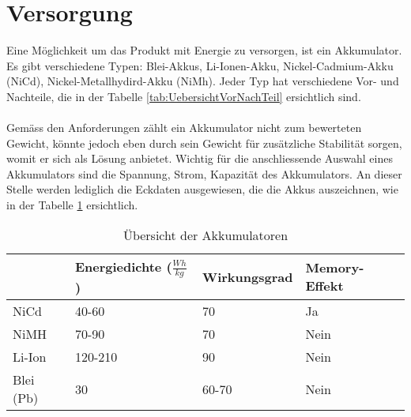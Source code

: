 ﻿\section{Versorgung}
Eine Möglichkeit um das Produkt mit Energie zu versorgen, ist ein Akkumulator. Es gibt verschiedene Typen: Blei-Akkus, Li-Ionen-Akku, Nickel-Cadmium-Akku (NiCd), Nickel-Metallhydird-Akku (NiMh). Jeder Typ hat verschiedene Vor- und Nachteile, die in der Tabelle \ref{tab:UebersichtVorNachTeil} ersichtlich sind.\\
\\
Gemäss den Anforderungen zählt ein Akkumulator nicht zum bewerteten Gewicht, könnte jedoch eben durch sein Gewicht für zusätzliche Stabilität sorgen, womit er sich als Lösung anbietet. Wichtig für die anschliessende Auswahl eines Akkumulators sind die Spannung, Strom, Kapazität des Akkumulators. An dieser Stelle werden lediglich die Eckdaten ausgewiesen, die die Akkus auszeichnen, wie in der Tabelle \ref{tab:UebersichtAkku} ersichtlich.\\ 

\begin{table}[h!]
	\begin{tabular}{|p{1.5cm}|p{3.4cm}|p{2.6cm}|p{2.8cm}|} \hline
		          &\textbf{Energiedichte} ($\frac{Wh}{kg}$)  & \textbf{Wirkungsgrad} & \textbf{Memory-Effekt}\\ \hline
		NiCd      & 40-60                                    & 70                    & Ja \\ \hline
		NiMH      & 70-90                                    & 70                    & Nein  \\ \hline
		Li-Ion    & 120-210                                  & 90                    & Nein \\ \hline
		Blei (Pb) & 30                                       & 60-70                 & Nein \\ \hline
	\end{tabular}
	\centering
	\caption{Übersicht der Akkumulatoren}
	\label{tab:UebersichtAkku} 
\end{table}

